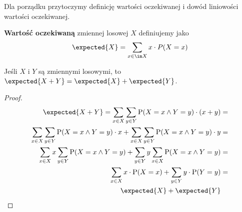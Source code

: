 Dla porządku przytoczymy definicję wartości oczekiwanej i dowód liniowości wartości oczekiwanej. 

\begin{definition}
    \textbf{Wartość oczekiwaną} zmiennej losowej \( X \) definiujemy jako
    \[
        \expected{X} = \sum_{x \in \im X} x \cdot P(X = x)
    \]
\end{definition}

\begin{theorem}
    Jeśli \(X\) i \(Y\) są zmiennymi losowymi, to \( \expected{X + Y} = \expected{X} + \expected{Y} \).
\end{theorem}
\begin{proof}
    \begin{align*}
        \expected{X+Y} = \sum_{x \in X} \sum_{y \in Y} \mathrm{P}(X=x \land Y=y) \cdot (x+y)  &= \\
        \sum_{x \in X} \sum_{y \in Y} \mathrm{P}(X=x \land Y=y) \cdot x + \sum_{x \in X} \sum_{y \in Y} \mathrm{P}(X=x \land Y=y) \cdot y &= \\ 
        \sum_{x \in X} x \sum_{y \in Y} \mathrm{P}(X=x \land Y=y) + \sum_{y \in Y} y \sum_{x \in X} \mathrm{P}(X=x \land Y=y) &= \\ 
        \sum_{x \in X} x \cdot \mathrm{P}(X=x) + \sum_{y \in Y} y \cdot \mathrm{P}(Y=y) &= \\ 
        \expected{X} + \expected{Y}
    \end{align*}
\end{proof}